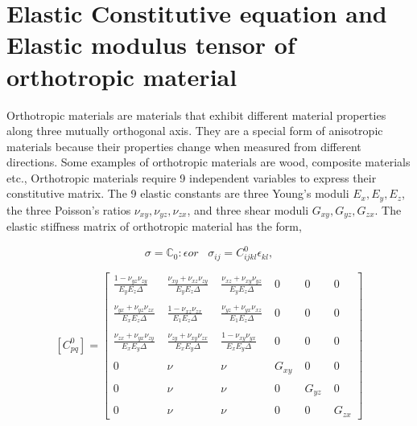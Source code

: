\documentclass[a4paper,12pt,twoside]{report}
\begin{document}
\section{Elastic Constitutive equation and Elastic modulus tensor of orthotropic material}\label{Constitutive matrix}
\indent\indent\indent Orthotropic materials are materials that exhibit different material properties along three mutually orthogonal axis. They are a special form of anisotropic materials because their properties change when measured from different directions. Some examples of orthotropic materials are wood, composite materials etc., Orthotropic materials require 9 independent variables to express their constitutive matrix. The 9 elastic constants are three Young's moduli $E_{x},E_{y},E_{z}$, the three Poisson's ratios $\nu_{xy},\nu_{yz},\nu_{zx}$, and three shear moduli $G_{xy},G_{yz},G_{zx}$. The elastic stiffness matrix of orthotropic material has the form,

\begin{equation}
  \sigma = \mathbb{C}_{0} : \epsilon   or \;\;\;  \sigma_{ij}  =  C^{0}_{ijkl}\epsilon_{kl},
\end{equation}

$$
[C^{0}_{pq}] =  
 \begin{bmatrix}
  \frac{1 - \nu_{yz}\nu_{zy}}{E_{y}E_{z}\Delta} \;& \frac{\nu_{xy} + \nu_{xz}\nu_{zy}}{E_{y}E_{z}\Delta}  \;& \frac{\nu_{xz} + \nu_{xy}\nu_{yz}}{E_{y}E_{z}\Delta}  \;& 0 \;& 0 \;& 0 \\
 \\
   \frac{\nu_{yx} + \nu_{yz}\nu_{zx}}{E_{x}E_{z}\Delta}  \;&  \frac{1 - \nu_{xz}\nu_{zx}}{E_{1}E_{z}\Delta} \; & \frac{\nu_{yz} +\nu_{yx}\nu_{xz}}{E_{1}E_{z}\Delta}  \; & 0\; & 0\; & 0 \\
  \\
    \frac{\nu_{zx} + \nu_{yx}\nu_{zy}}{E_{x}E_{y}\Delta}  \;&   \frac{\nu_{zy} + \nu_{xy}\nu_{zx}}{E_{x}E_{y}\Delta} \;& \frac{1 - \nu_{xy}\nu_{yx}}{E_{x}E_{y}\Delta}  \;& 0 \;& 0 \;& 0 \\ 
\\

 
  0 \;& \nu \;& \nu \;& G_{xy} \;& 0 \;& 0 \\
  \\
  0 \;& \nu \;& \nu \;& 0 \;& G_{yz} \;& 0 \\
  \\
  0\;& \nu \;& \nu \;& 0 \;& 0 \;& G_{zx} 
 \end{bmatrix}
 $$\\
 
\end{document}
